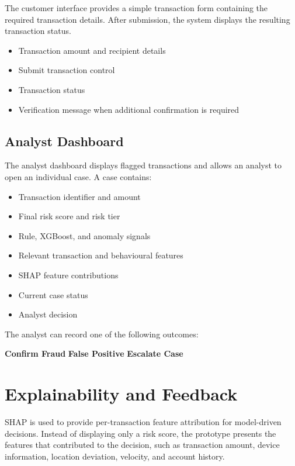 \documentclass[11pt,a4paper]{article}
\begin{document}
The customer interface provides a simple transaction form containing the required transaction
details. After submission, the system displays the resulting transaction status.

\begin{itemize}[leftmargin=1.4em,itemsep=2pt]
\item Transaction amount and recipient details
\item Submit transaction control
\item Transaction status
\item Verification message when additional confirmation is required
\end{itemize}

\subsection{Analyst Dashboard}

The analyst dashboard displays flagged transactions and allows an analyst to open an individual
case. A case contains:

\begin{itemize}[leftmargin=1.4em,itemsep=2pt]
\item Transaction identifier and amount
\item Final risk score and risk tier
\item Rule, XGBoost, and anomaly signals
\item Relevant transaction and behavioural features
\item SHAP feature contributions
\item Current case status
\item Analyst decision
\end{itemize}

The analyst can record one of the following outcomes:

\begin{center}
\textbf{Confirm Fraud}
\qquad
\textbf{False Positive}
\qquad
\textbf{Escalate Case}
\end{center}

\section{Explainability and Feedback}

SHAP is used to provide per-transaction feature attribution for model-driven decisions. Instead
of displaying only a risk score, the prototype presents the features that contributed to the
decision, such as transaction amount, device information, location deviation, velocity, and
account history.
\end{document}
